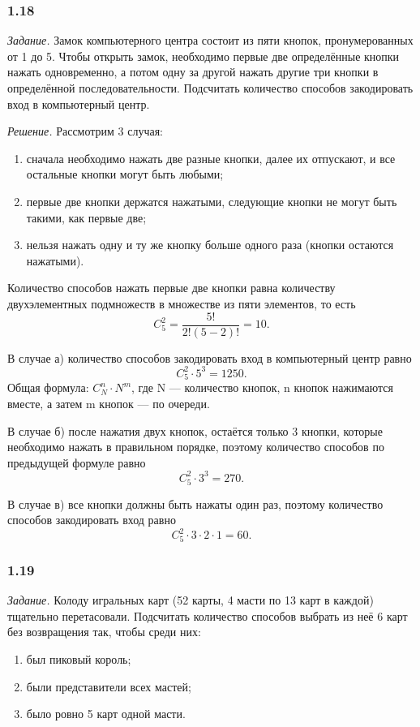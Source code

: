 \subsubsection*{1.18}

\textit{Задание.} Замок компьютерного центра состоит из пяти кнопок, пронумерованных от 1 до 5.
Чтобы открыть замок, необходимо первые две определённые кнопки нажать одновременно, а потом одну за другой нажать другие три кнопки в определённой последовательности. Подсчитать количество способов закодировать вход в компьютерный центр.

\textit{Решение.} Рассмотрим 3 случая: 
\begin{enumerate}[label=\alph*)]
\item сначала необходимо нажать две разные кнопки, далее их отпускают, и все остальные кнопки могут быть любыми; 
\item первые две кнопки держатся нажатыми, следующие кнопки не могут быть такими, как первые две; 
\item нельзя нажать одну и ту же кнопку больше одного раза (кнопки остаются нажатыми).
\end{enumerate}

Количество способов нажать первые две кнопки равна количеству двухэлементных подмножеств в множестве из пяти элементов, то есть
$$ C_5^2 = \frac{5!}{2! \left( 5 - 2 \right)!} = 10.$$

В случае а) количество способов закодировать вход в компьютерный центр равно
$$ C_5^2 \cdot 5^3 = 1250.$$
Общая формула: $ C_N^n \cdot N^m $, где N --- количество кнопок, n кнопок нажимаются вместе, а затем m кнопок --- по очереди.

В случае б) после нажатия двух кнопок, остаётся только 3 кнопки, которые необходимо нажать в правильном порядке,
поэтому количество способов по предыдущей формуле равно
$$ C_5^2 \cdot 3^3 = 270.$$

В случае в) все кнопки должны быть нажаты один раз, поэтому количество способов закодировать вход равно
$$ C_5^2 \cdot 3 \cdot 2 \cdot 1 = 60.$$

\subsubsection*{1.19}

\textit{Задание.} Колоду игральных карт (52 карты, 4 масти по 13 карт в каждой) тщательно перетасовали.
Подсчитать количество способов выбрать из неё 6 карт без возвращения так, чтобы среди них:
\begin{enumerate}[label=\alph*)]
\item был пиковый король;
\item были представители всех мастей;
\item было ровно 5 карт одной масти.
\end{enumerate}

